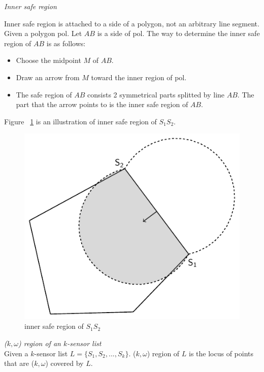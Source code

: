 \begin{df}
{\itshape Inner safe region}\par
Inner safe region is attached to a side of a polygon, not an arbitrary line segment. Given a polygon {\sc pol}. Let $AB$ is a side of {\sc pol}. The way to determine the inner safe region of $AB$ is as follows:
\begin{itemize}
	\item Choose the midpoint $M$ of $AB$.
	\item Draw an arrow from $M$ toward the inner region of {\sc pol}.
	\item The safe region of $AB$ consists 2 symmetrical parts splitted by line $AB$. The part that the arrow points to is the inner safe region of $AB$.
\end{itemize}
\end{df}
Figure ~\ref{innersafe} is an illustration of inner safe region of $S_1S_2$.
\begin{figure}[!h]
	\begin{center}
	\includegraphics[scale=0.6]{innersafe.pdf}	
	\caption{inner safe region of $S_1S_2$}
	\label{innersafe}
	\end{center}
\end{figure}
\begin{df}
{\itshape($k,\omega$) region of an $k$-sensor list}\\
Given a $k$-sensor list $L = \{S_1,S_2,...,S_k\}$. ($k,\omega$) region of $L$ is the locus of points that are ($k,\omega$) covered by $L$.
\end{df}
